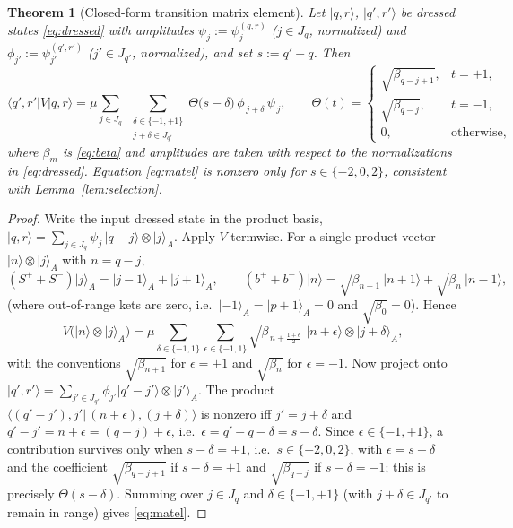\documentclass[12pt]{article}
\newtheorem{theorem}{Theorem}
\theoremstyle{definition}
\theoremstyle{remark}
\newcommand{\ket}[1]{\lvert #1\rangle}
\newcommand{\bra}[1]{\langle #1\rvert}
\newcommand{\bp}{b^{+}}
\newcommand{\bm}{b^{-}}
\begin{document}
\begin{theorem}[Closed-form transition matrix element]\label{thm:transition}
Let $\ket{q,r}$, $\ket{q',r'}$ be dressed states \eqref{eq:dressed} with amplitudes
$\psi_j:=\psi^{(q,r)}_j$ ($j\in J_q$, normalized) and
$\phi_{j'}:=\psi^{(q',r')}_{j'}$ ($j'\in J_{q'}$, normalized), and set $s:=q'-q$.
Then
\begin{equation}\label{eq:matel}
\bra{q',r'}V\ket{q,r}
=\mu\sum_{j\in J_q}\;\sum_{\substack{\delta\in\{-1,+1\}\\ j+\delta\in J_{q'}}}
\Theta\bigl(s-\delta\bigr)\,\phi_{\,j+\delta}\,\psi_{\,j},
\qquad
\Theta(t)=\begin{cases}\sqrt{\beta_{q-j+1}}, & t=+1,\\[2pt]
\sqrt{\beta_{q-j}}, & t=-1,\\[2pt] 0, & \text{otherwise},\end{cases}
\end{equation}
where $\beta_m$ is \eqref{eq:beta} and amplitudes are taken with respect to the
normalizations in \eqref{eq:dressed}. Equation \eqref{eq:matel} is nonzero only for
$s\in\{-2,0,2\}$, consistent with Lemma~\ref{lem:selection}.
\end{theorem}

\begin{proof}
Write the input dressed state in the product basis,
$\ket{q,r}=\sum_{j\in J_q}\psi_j\,\ket{q-j}\otimes\ket j_A$. Apply $V$ termwise.
For a single product vector $\ket{n}\otimes\ket j_A$ with $n=q-j$,
\[
(S^{+}+S^{-})\ket j_A=\ket{j-1}_A+\ket{j+1}_A,\qquad
(\bp+\bm)\ket n=\sqrt{\beta_{n+1}}\,\ket{n+1}+\sqrt{\beta_{n}}\,\ket{n-1},
\]
(where out-of-range kets are zero, i.e.\ $\ket{-1}_A=\ket{p+1}_A=0$ and
$\sqrt{\beta_0}=0$). Hence
\[
V\bigl(\ket{n}\otimes\ket j_A\bigr)
=\mu\!\!\sum_{\delta\in\{-1,1\}}\sum_{\epsilon\in\{-1,1\}}
\sqrt{\beta_{\,n+\tfrac{1+\epsilon}{2}}}\;\ket{n+\epsilon}\otimes\ket{j+\delta}_A ,
\]
with the conventions $\sqrt{\beta_{n+1}}$ for $\epsilon=+1$ and $\sqrt{\beta_{n}}$
for $\epsilon=-1$. Now project onto
$\ket{q',r'}=\sum_{j'\in J_{q'}}\phi_{j'}\ket{q'-j'}\otimes\ket{j'}_A$. The product
$\langle (q'-j'),j'|\,(n+\epsilon),(j+\delta)\rangle$ is nonzero iff $j'=j+\delta$
and $q'-j'=n+\epsilon=(q-j)+\epsilon$, i.e.\ $\epsilon=q'-q-\delta=s-\delta$. Since
$\epsilon\in\{-1,+1\}$, a contribution survives only when $s-\delta=\pm1$, i.e.\
$s\in\{-2,0,2\}$, with $\epsilon=s-\delta$ and the coefficient
$\sqrt{\beta_{q-j+1}}$ if $s-\delta=+1$ and $\sqrt{\beta_{q-j}}$ if $s-\delta=-1$;
this is precisely $\Theta(s-\delta)$. Summing over $j\in J_q$ and
$\delta\in\{-1,+1\}$ (with $j+\delta\in J_{q'}$ to remain in range) gives
\eqref{eq:matel}.
\end{proof}
\end{document}
